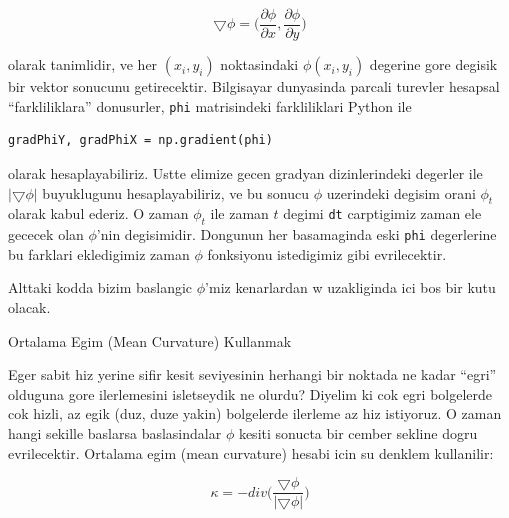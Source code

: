 \documentclass[12pt,fleqn]{article}\usepackage{../common}
\begin{document}
$$ 
\bigtriangledown \phi = \bigg(
\frac{\partial \phi}{\partial x},
\frac{\partial \phi}{\partial y} \bigg)
$$

olarak tanimlidir, ve her $(x_i,y_i)$ noktasindaki $\phi(x_i,y_i)$
degerine gore degisik bir vektor sonucunu getirecektir. Bilgisayar
dunyasinda parcali turevler hesapsal ``farkliliklara'' donusurler,
\verb!phi! matrisindeki farkliliklari Python ile

\begin{verbatim}
gradPhiY, gradPhiX = np.gradient(phi)
\end{verbatim}

olarak hesaplayabiliriz. Ustte elimize gecen gradyan dizinlerindeki
degerler ile $|\bigtriangledown\phi|$ buyuklugunu hesaplayabiliriz, ve bu
sonucu $\phi$ uzerindeki degisim orani $\phi_t$ olarak kabul ederiz. O
zaman $\phi_t$ ile zaman $t$ degimi \verb!dt! carptigimiz zaman ele gececek
olan $\phi$'nin degisimidir. Dongunun her basamaginda eski \verb!phi!
degerlerine bu farklari ekledigimiz zaman $\phi$ fonksiyonu istedigimiz
gibi evrilecektir.

Alttaki kodda bizim baslangic $\phi$'miz kenarlardan w uzakliginda ici bos
bir kutu olacak. 

Ortalama Egim (Mean Curvature) Kullanmak

Eger sabit hiz yerine sifir kesit seviyesinin herhangi bir noktada ne kadar
``egri'' olduguna gore ilerlemesini isletseydik ne olurdu?  Diyelim ki cok
egri bolgelerde cok hizli, az egik (duz, duze yakin) bolgelerde ilerleme az
hiz istiyoruz. O zaman hangi sekille baslarsa baslasindalar $\phi$ kesiti
sonucta bir cember sekline dogru evrilecektir. Ortalama egim (mean
curvature) hesabi icin su denklem kullanilir:

$$ \kappa = -div \bigg( \frac{\bigtriangledown \phi}
{|\bigtriangledown \phi| } \bigg) $$
\end{document}
